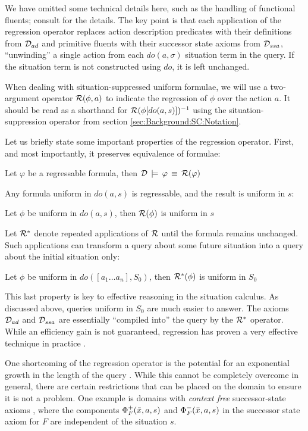 We have omitted some technical details here, such as the handling
of functional fluents; consult \citep{pirri99contributions_sitcalc}
for the details. The key point is that each application of the regression
operator replaces action description predicates with their definitions
from $\mathcal{D}_{ad}$ and primitive fluents with their successor state
axioms from $\mathcal{D}_{ssa}$, {}``unwinding'' a single action from each
$do(a,\sigma)$ situation term in the query. If the situation term
is not constructed using $do$, it is left unchanged.

When dealing with situation-suppressed uniform formulae, we will use
a two-argument operator $\mathcal{R}(\phi,a)$ to indicate the regression
of $\phi$ over the action $a$. It should be read as a shorthand
for $\mathcal{R}(\phi[do(a,s)])^{-1}$ using the situation-suppression operator
from section \ref{sec:Background:SC:Notation}.

Let us briefly state some important properties of the regression operator.
First, and most importantly, it preserves equivalence of formulae:

\begin{prop}
Let $\varphi$ be a regressable formula, then $\mathcal{D}\,\models\,\varphi\,\equiv\,\mathcal{R}(\varphi)$ 
\end{prop}
Any formula uniform in $do(a,s)$ is regressable, and the result is
uniform in $s$:

\begin{prop}
Let $\phi$ be uniform in $do(a,s)$, then $\mathcal{R}(\phi)$ is uniform
in $s$ 
\end{prop}
Let $\mathcal{R}^{*}$ denote repeated applications of $\mathcal{R}$ until the
formula remains unchanged. Such applications can transform a query
about some future situation into a query about the initial situation
only:

\begin{prop}
Let $\phi$ be uniform in \emph{$do([a_{1}\dots a_{n}],S_{0})$,}
then $\mathcal{R}^{*}(\phi)$ is uniform in $S_{0}$ 
\end{prop}
This last property is key to effective reasoning in the situation
calculus. As discussed above, queries uniform in $S_{0}$ are much
easier to answer. The axioms $\mathcal{D}_{ad}$ and $\mathcal{D}_{ssa}$ are essentially
{}``compiled into'' the query by the $\mathcal{R}^{*}$ operator. While
an efficiency gain is not guaranteed, regression has proven a very
effective technique in practice \citep{levesque97golog,pirri99contributions_sitcalc}.

One shortcoming of the regression operator is the potential for an
exponential growth in the length of the query \citep{reiter91frameprob}.
While this cannot be completely overcome in general, there are certain
restrictions that can be placed on the domain to ensure it is not
a problem. One example is domains with \emph{context free} successor-state
axioms \citep{reiter01kia}, where the components $\Phi_{F}^{+}(\bar{x},a,s)$
and $\Phi_{F}^{-}(\bar{x},a,s)$ in the successor state axiom for
$F$ are independent of the situation $s$.

